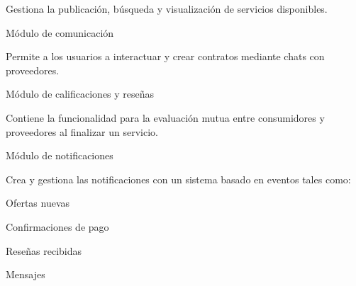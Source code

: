\documentclass{article}
\begin{document}
    Gestiona la publicación, búsqueda y visualización de servicios disponibles. 

    Módulo de comunicación  

    Permite a los usuarios a interactuar y crear contratos mediante chats con proveedores. 

    Módulo de calificaciones y reseñas   

    Contiene la funcionalidad para la evaluación mutua entre consumidores y proveedores al finalizar un servicio.  

    Módulo de notificaciones  

    Crea y gestiona las notificaciones con un sistema basado en eventos tales como: 

    Ofertas nuevas 

    Confirmaciones de pago 

    Reseñas recibidas  

    Mensajes 
\end{document}
